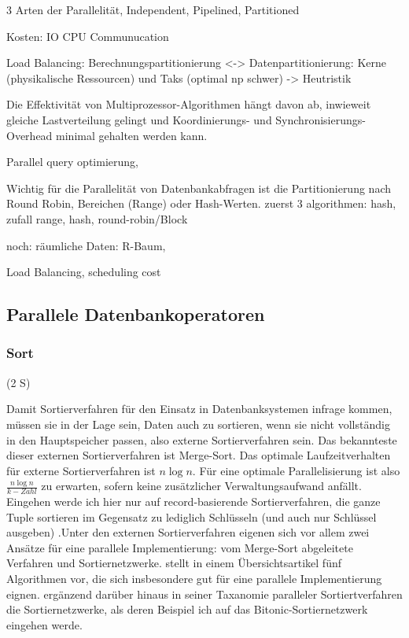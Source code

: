 \documentclass[a4paper,12pt,twoside]{article}
\begin{document}
3 Arten der Parallelität, Independent, Pipelined, Partitioned {\cite{Yu1998}}




Kosten: IO CPU Communucation {\cite [S. 23]{Yu1998}}

Load Balancing: Berechnungspartitionierung <-> Datenpartitionierung: Kerne (physikalische Ressourcen) und Taks (optimal np schwer) -> Heutristik

Die Effektivität von Multiprozessor-Algorithmen hängt davon ab, inwieweit gleiche Lastverteilung gelingt und Koordinierungs- und Synchronisierungs-Overhead minimal gehalten
werden kann. {\autocite{Lakshmi1990}}


Parallel query optimierung, 


Wichtig für die Parallelität von Datenbankabfragen ist die Partitionierung nach Round Robin, Bereichen (Range) oder Hash-Werten. {\cite{Yu1998}}
zuerst 3 algorithmen: hash, zufall
range, hash, round-robin/Block

noch: räumliche Daten: R-Baum, 

Load Balancing, scheduling cost



\subsection{Parallele Datenbankoperatoren}

\subsubsection{Sort} (2 S)

Damit Sortierverfahren für den Einsatz in Datenbanksystemen infrage kommen, müssen sie in der Lage sein, Daten auch zu sortieren, wenn sie nicht vollständig in den Hauptspeicher passen, also externe Sortierverfahren sein. Das bekannteste dieser externen Sortierverfahren ist Merge-Sort. Das optimale Laufzeitverhalten für externe Sortierverfahren ist $ n \log n $. Für eine optimale Parallelisierung ist also $ \frac{n \log n} {k-Zahl} $ zu erwarten, sofern keine zusätzlicher Verwaltungsaufwand anfällt. Eingehen werde ich hier nur auf record-basierende Sortierverfahren, die ganze Tuple sortieren im Gegensatz zu lediglich Schlüsseln (und auch nur Schlüssel ausgeben) {\autocite{Salzberg1990}}.Unter den externen Sortierverfahren eigenen sich vor allem zwei Ansätze für eine parallele Implementierung: vom Merge-Sort abgeleitete Verfahren und Sortiernetzwerke. {\textcite[S. 831ff]{Taniar2000}} stellt in einem Übersichtsartikel fünf Algorithmen vor, die sich insbesondere gut für eine parallele Implementierung eignen. {\textcite[S. 9ff] {Bitton1984}} ergänzend darüber hinaus in seiner Taxanomie paralleler Sortiertverfahren die Sortiernetzwerke, als deren Beispiel ich auf das Bitonic-Sortiernetzwerk eingehen werde.
\end{document}
